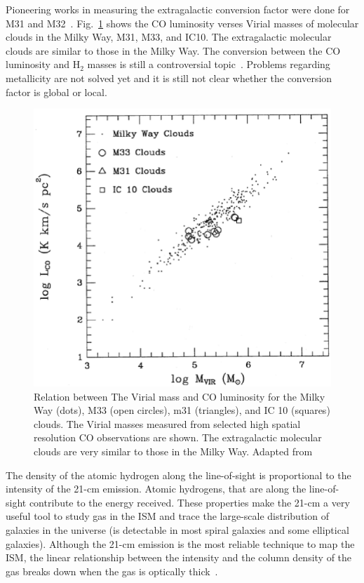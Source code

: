 Pioneering works in measuring the extragalactic conversion factor were done for M31 and M32~\citep[e.g.,][]{Wilson89, Wilson90}. 
Fig.~\ref{fig: mco} shows the CO luminosity verses Virial masses of molecular clouds in the Milky Way, M31, M33, and IC10. 
The extragalactic molecular clouds are similar to those in the Milky Way. 
The conversion between the CO luminosity and H$_2$ masses is still a controversial topic~\citep[e.g.][]{Narayanan11, Bolato13, Sandstrom13}.
Problems regarding metallicity are not solved yet and it is still not clear whether the conversion factor is global or local. 

\begin{figure}
\label{fig: mco}
\centering
\includegraphics[width=16cm]{../image_intro/mvirial_lco.eps}
\caption{Relation between The Virial mass and CO luminosity for the Milky Way (dots), M33 (open circles), m31 (triangles), and IC 10 (squares) clouds. The Virial masses measured from selected high spatial resolution CO observations are shown. The extragalactic molecular clouds are very similar to those in the Milky Way. Adapted from~\cite{Young91}}
\end{figure}
 
The density of the atomic hydrogen along the line-of-sight is proportional to the intensity of the 21-cm emission. 
Atomic hydrogens, that are along the line-of-sight contribute to the energy received. 
These properties make the 21-cm a very useful tool to study gas in the ISM and trace the large-scale distribution of galaxies in the universe (\hi is detectable in most spiral galaxies and some elliptical galaxies).
Although the 21-cm emission is the most reliable technique to map the ISM, the linear relationship between the intensity and the column density of the gas breaks down when the gas is optically thick~\citep{Braun09}.

